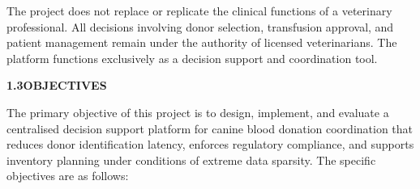 \documentclass[12pt,a4paper]{article}
\begin{document}
\noindent The project does not replace or replicate the clinical functions of a veterinary professional. All decisions involving donor selection, transfusion approval, and patient management remain under the authority of licensed veterinarians. The platform functions exclusively as a decision support and coordination tool.

\vspace{1.5em}
\noindent\textbf{1.3\quad OBJECTIVES}
\vspace{0.6em}

\noindent The primary objective of this project is to design, implement, and evaluate a centralised decision support platform for canine blood donation coordination that reduces donor identification latency, enforces regulatory compliance, and supports inventory planning under conditions of extreme data sparsity. The specific objectives are as follows:
\end{document}
